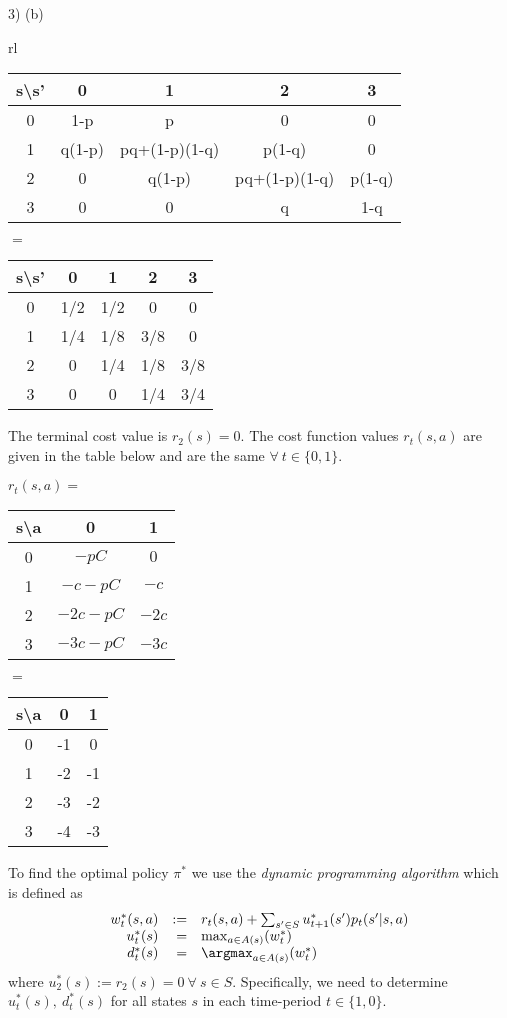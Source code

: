 \documentclass[11pt,a4paper]{article}
\begin{document}
\begin{answer}{3) (b)}
\begin{adjustwidth}{-2cm}{}
\begin{tabular}{rl}
\begin{tabular}{c|cccc}
      s\textbackslash s'&0&1&2&3\\\hline
      0&1-p&p&0&0\\
      1&q(1-p)&pq+(1-p)(1-q)&p(1-q)&0\\
      2&0&q(1-p)&pq+(1-p)(1-q)&p(1-q)\\
      3&0&0&q&1-q
      \end{tabular}$=$
      \begin{tabular}{c|cccc}
        s\textbackslash s'&0&1&2&3\\\hline
        0&1/2&1/2&0&0\\
        1&1/4&1/8&3/8&0\\
        2&0&1/4&1/8&3/8\\
        3&0&0&1/4&3/4
      \end{tabular}
    \end{tabular}
  \end{adjustwidth}
  The terminal cost value is $r_2(s)=0$. The cost function values $r_t(s,a)$ are given in the table below and are the same $\forall\ t\in\{0,1\}$.
  \begin{center}
    $r_t(s,a)=$\begin{tabular}{c|cc}
      s\textbackslash a&0&1\\\hline
      0&$-pC$&$0$\\
      1&$-c-pC$&$-c$\\
      2&$-2c-pC$&$-2c$\\
      3&$-3c-pC$&$-3c$\\
    \end{tabular}
    $=$
    \begin{tabular}{c|cc}
      s\textbackslash a&0&1\\\hline
      0&-1&0\\
      1&-2&-1\\
      2&-3&-2\\
      3&-4&-3
    \end{tabular}
  \end{center}
  To find the optimal policy $\pi^*$ we use the \textit{dynamic programming algorithm} which is defined as
  \[\begin{array}{rrl}
    w_t^*(s,a)&:=&r_t(s,a)+\sum_{s'\in S}u_{t+1}^*(s')p_t(s'|s,a)\\
    u_t^*(s)&=&\max_{a\in A(s)}(w_t^*)\\
    d_t^*(s)&=&\argmax_{a\in A(s)}(w_t^*)
  \end{array}\]
  where $u_2^*(s):=r_2(s)=0\ \forall\ s\in S$. Specifically, we need to determine $u_t^*(s),\ d_t^*(s)$ for all states $s$ in each time-period $t\in\{1,0\}$.

\end{answer}
\end{document}
